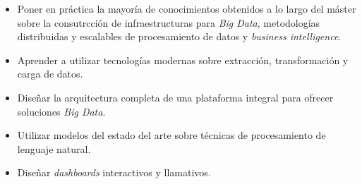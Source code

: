 \begin{itemize}
    \item Poner en práctica la mayoría de conocimientos obtenidos a lo largo del máster sobre la consutrcción de infraestructuras para \textit{Big Data}, metodologías distribuidas y escalables de procesamiento de datos y \textit{business intelligence}. 

    \item Aprender a utilizar tecnologías modernas sobre extracción, transformación y carga de datos.

    \item Diseñar la arquitectura completa de una plataforma integral para ofrecer soluciones \textit{Big Data}. 

    \item Utilizar modelos del estado del arte sobre técnicas de procesamiento de lenguaje natural.

    \item Diseñar \textit{dashboards} interactivos y llamativos.
\end{itemize}

